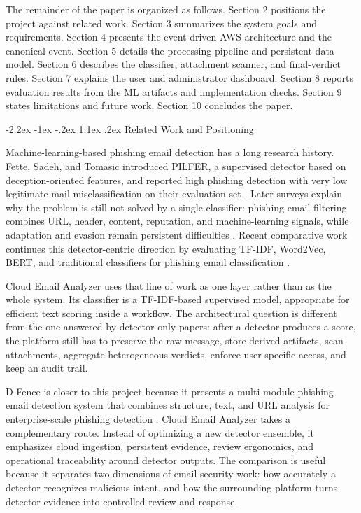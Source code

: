 \documentclass[12pt,a4paper]{article}
\makeatletter
\renewcommand\section{\@startsection {section}{1}{\z@}%
  {-2.2ex \@plus -1ex \@minus -.2ex}%
  {1.1ex \@plus .2ex}%
  {\centering\normalfont\normalsize\bfseries}}
\makeatother
\begin{document}
The remainder of the paper is organized as follows. Section 2 positions the project against related work. Section 3 summarizes the system goals and requirements. Section 4 presents the event-driven AWS architecture and the canonical event. Section 5 details the processing pipeline and persistent data model. Section 6 describes the classifier, attachment scanner, and final-verdict rules. Section 7 explains the user and administrator dashboard. Section 8 reports evaluation results from the ML artifacts and implementation checks. Section 9 states limitations and future work. Section 10 concludes the paper.

\section{Related Work and Positioning}

Machine-learning-based phishing email detection has a long research history. Fette, Sadeh, and Tomasic introduced PILFER, a supervised detector based on deception-oriented features, and reported high phishing detection with very low legitimate-mail misclassification on their evaluation set \cite{fette2007learning}. Later surveys explain why the problem is still not solved by a single classifier: phishing email filtering combines URL, header, content, reputation, and machine-learning signals, while adaptation and evasion remain persistent difficulties \cite{almomani2013survey,khonji2013survey}. Recent comparative work continues this detector-centric direction by evaluating TF-IDF, Word2Vec, BERT, and traditional classifiers for phishing email classification \cite{altawil2024comparative}.

Cloud Email Analyzer uses that line of work as one layer rather than as the whole system. Its classifier is a TF-IDF-based supervised model, appropriate for efficient text scoring inside a workflow. The architectural question is different from the one answered by detector-only papers: after a detector produces a score, the platform still has to preserve the raw message, store derived artifacts, scan attachments, aggregate heterogeneous verdicts, enforce user-specific access, and keep an audit trail.

D-Fence is closer to this project because it presents a multi-module phishing email detection system that combines structure, text, and URL analysis for enterprise-scale phishing detection \cite{lee2021dfence}. Cloud Email Analyzer takes a complementary route. Instead of optimizing a new detector ensemble, it emphasizes cloud ingestion, persistent evidence, review ergonomics, and operational traceability around detector outputs. The comparison is useful because it separates two dimensions of email security work: how accurately a detector recognizes malicious intent, and how the surrounding platform turns detector evidence into controlled review and response.
\end{document}
